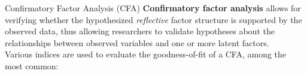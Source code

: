 \documentclass{beamer}
\begin{document}
\begin{frame}{Confirmatory Factor Analysis (CFA)}
    \textbf{Confirmatory factor analysis} allows for verifying whether the hypothesized \textit{reflective} factor structure is supported by the observed data, thus allowing researchers to validate hypotheses about the relationships between observed variables and one or more latent factors.\\
    \pause
    \vspace{1em}
    Various indices are used to evaluate the goodness-of-fit of a CFA, among the most common: \\
    \vspace{0.5em}
\end{frame}
\end{document}
